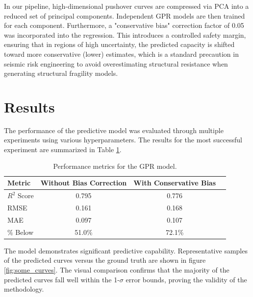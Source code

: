 \begin{refsection}
In our pipeline, high-dimensional pushover curves are compressed via PCA into a reduced set of principal components. Independent GPR models are then trained for each component. Furthermore, a "conservative bias" correction factor of 0.05 was incorporated into the regression. This introduces a controlled safety margin, ensuring that in regions of high uncertainty, the predicted capacity is shifted toward more conservative (lower) estimates, which is a standard precaution in seismic risk engineering to avoid overestimating structural resistance when generating structural fragility models.

\renewcommand{\sectionnametext}{Results}
\renewcommand{\headingtextR}{\thesection. \sectionnametext}
\section{\sectionnametext}

The performance of the predictive model was evaluated through multiple experiments using various hyperparameters. The results for the most successful experiment are summarized in Table \ref{tab:gpr_results}.

\begin{table}[htbp]
\centering
\begin{tabular}{|l|c|c|c|}
\hline
\textbf{Metric} & \textbf{Without Bias Correction} & \textbf{With Conservative Bias} \\ \hline
$R^2$ Score     & 0.795                            & 0.776                          \\ \hline
RMSE            & 0.161                            & 0.168                          \\ \hline
MAE             & 0.097                            & 0.107                          \\ \hline
$\%$ Below      & 51.0\%                           & 72.1\%                         \\ \hline
\end{tabular}
\caption{Performance metrics for the GPR model.}
\label{tab:gpr_results}
\end{table}

The model demonstrates significant predictive capability. Representative samples of the predicted curves versus the ground truth are shown in figure \ref{fig:some_curves}. The visual comparison confirms that the majority of the predicted curves fall well within the 1-$\sigma$ error bounds, proving the validity of the methodology. 


\end{refsection}

